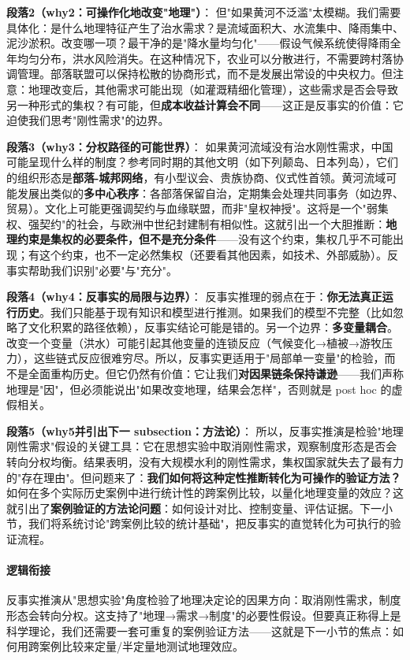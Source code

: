 \documentclass[../main.tex]{subfiles}
\begin{document}
\textbf{段落2（why2：可操作化地改变"地理"）}：  
但"如果黄河不泛滥"太模糊。我们需要具体化：是什么地理特征产生了治水需求？是流域面积大、水流集中、降雨集中、泥沙淤积。改变哪一项？最干净的是"降水量均匀化"——假设气候系统使得降雨全年均匀分布，洪水风险消失。在这种情况下，农业可以分散进行，不需要跨村落协调管理。部落联盟可以保持松散的协商形式，而不是发展出常设的中央权力。但注意：地理改变后，其他需求可能出现（如灌溉精细化管理），这些需求是否会导致另一种形式的集权？有可能，但\textbf{成本收益计算会不同}——这正是反事实的价值：它迫使我们思考"刚性需求"的边界。

\textbf{段落3（why3：分权路径的可能世界）}：  
如果黄河流域没有治水刚性需求，中国可能呈现什么样的制度？参考同时期的其他文明（如下列颠岛、日本列岛），它们的组织形态是\textbf{部落-城邦网络}，有小型议会、贵族协商、仪式性首领。黄河流域可能发展出类似的\textbf{多中心秩序}：各部落保留自治，定期集会处理共同事务（如边界、贸易）。文化上可能更强调契约与血缘联盟，而非"皇权神授"。这将是一个"弱集权、强契约"的社会，与欧洲中世纪封建制有相似性。这就引出一个大胆推断：\textbf{地理约束是集权的必要条件，但不是充分条件}——没有这个约束，集权几乎不可能出现；有这个约束，也不一定必然集权（还要看其他因素，如技术、外部威胁）。反事实帮助我们识别"必要"与"充分"。

\textbf{段落4（why4：反事实的局限与边界）}：  
反事实推理的弱点在于：\textbf{你无法真正运行历史}。我们只能基于现有知识和模型进行推测。如果我们的模型不完整（比如忽略了文化积累的路径依赖），反事实结论可能是错的。另一个边界：\textbf{多变量耦合}。改变一个变量（洪水）可能引起其他变量的连锁反应（气候变化→植被→游牧压力），这些链式反应很难穷尽。所以，反事实更适用于"局部单一变量"的检验，而不是全面重构历史。但它仍然有价值：它让我们\textbf{对因果链条保持谦逊}——我们声称地理是"因"，但必须能说出"如果改变地理，结果会怎样"，否则就是 post hoc 的虚假相关。

\textbf{段落5（why5并引出下一 subsection：方法论）}：  
所以，反事实推演是检验"地理刚性需求"假设的关键工具：它在思想实验中取消刚性需求，观察制度形态是否会转向分权均衡。结果表明，没有大规模水利的刚性需求，集权国家就失去了最有力的"存在理由"。但问题来了：\textbf{我们如何将这种定性推断转化为可操作的验证方法？} 如何在多个实际历史案例中进行统计性的跨案例比较，以量化地理变量的效应？这就引出了\textbf{案例验证的方法论问题}：如何设计对比、控制变量、评估证据。下一小节，我们将系统讨论"跨案例比较的统计基础"，把反事实的直觉转化为可执行的验证流程。

\paragraph*{逻辑衔接}
反事实推演从"思想实验"角度检验了地理决定论的因果方向：取消刚性需求，制度形态会转向分权。这支持了"地理→需求→制度"的必要性假设。但要真正称得上是科学理论，我们还需要一套可重复的案例验证方法——这就是下一小节的焦点：如何用跨案例比较来定量/半定量地测试地理效应。
\end{document}

